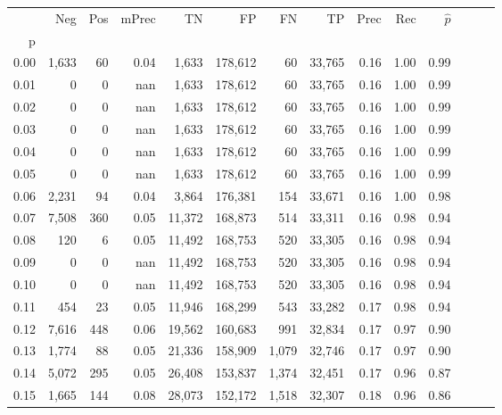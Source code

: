 \begin{tabular}{rrrrrrrrrrrrrr}
\toprule
{} &     Neg &    Pos & mPrec &       TN &       FP &      FN &      TP &  Prec &   Rec & $\hat{p}$ \\
p    &         &        &       &          &          &         &         &       &       &           \\
\midrule
0.00 &   1,633 &     60 &  0.04 &    1,633 &  178,612 &      60 &  33,765 &  0.16 &  1.00 &      0.99 \\
0.01 &       0 &      0 &   nan &    1,633 &  178,612 &      60 &  33,765 &  0.16 &  1.00 &      0.99 \\
0.02 &       0 &      0 &   nan &    1,633 &  178,612 &      60 &  33,765 &  0.16 &  1.00 &      0.99 \\
0.03 &       0 &      0 &   nan &    1,633 &  178,612 &      60 &  33,765 &  0.16 &  1.00 &      0.99 \\
0.04 &       0 &      0 &   nan &    1,633 &  178,612 &      60 &  33,765 &  0.16 &  1.00 &      0.99 \\
0.05 &       0 &      0 &   nan &    1,633 &  178,612 &      60 &  33,765 &  0.16 &  1.00 &      0.99 \\
0.06 &   2,231 &     94 &  0.04 &    3,864 &  176,381 &     154 &  33,671 &  0.16 &  1.00 &      0.98 \\
0.07 &   7,508 &    360 &  0.05 &   11,372 &  168,873 &     514 &  33,311 &  0.16 &  0.98 &      0.94 \\
0.08 &     120 &      6 &  0.05 &   11,492 &  168,753 &     520 &  33,305 &  0.16 &  0.98 &      0.94 \\
0.09 &       0 &      0 &   nan &   11,492 &  168,753 &     520 &  33,305 &  0.16 &  0.98 &      0.94 \\
0.10 &       0 &      0 &   nan &   11,492 &  168,753 &     520 &  33,305 &  0.16 &  0.98 &      0.94 \\
0.11 &     454 &     23 &  0.05 &   11,946 &  168,299 &     543 &  33,282 &  0.17 &  0.98 &      0.94 \\
0.12 &   7,616 &    448 &  0.06 &   19,562 &  160,683 &     991 &  32,834 &  0.17 &  0.97 &      0.90 \\
0.13 &   1,774 &     88 &  0.05 &   21,336 &  158,909 &   1,079 &  32,746 &  0.17 &  0.97 &      0.90 \\
0.14 &   5,072 &    295 &  0.05 &   26,408 &  153,837 &   1,374 &  32,451 &  0.17 &  0.96 &      0.87 \\
0.15 &   1,665 &    144 &  0.08 &   28,073 &  152,172 &   1,518 &  32,307 &  0.18 &  0.96 &      0.86 \\

\end{tabular}
